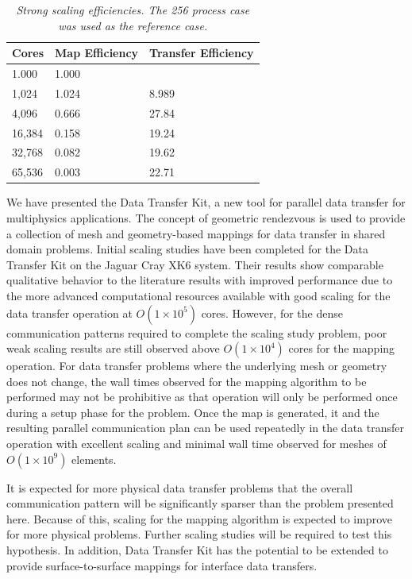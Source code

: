 \documentclass{mc2013}
\begin{document}
\begin{table}[htpb!]
  \begin{center}
    \begin{tabular}{lll}\hline\hline
      \multicolumn{1}{c}{Cores}& \multicolumn{1}{c}{Map Efficiency} &
      \multicolumn{1}{c}{Transfer Efficiency}\\\hline\hline %
      1.000 & 1.000 \\ 1,024 & 1.024 & 8.989 \\ 4,096 & 0.666 & 27.84
      \\ 16,384 & 0.158 & 19.24 \\ 32,768 & 0.082 & 19.62 \\ 65,536 &
      0.003 & 22.71 \\ \hline\hline
    \end{tabular}
  \end{center}
  \caption{\sl Strong scaling efficiencies. The 256 process case was
    used as the reference case.}
  \label{tab:strong_efficiency}
\end{table}


We have presented the Data Transfer Kit, a new tool for parallel data
transfer for multiphysics applications. The concept of geometric
rendezvous is used to provide a collection of mesh and geometry-based
mappings for data transfer in shared domain problems. Initial scaling
studies have been completed for the Data Transfer Kit on the Jaguar
Cray XK6 system. Their results show comparable qualitative behavior to
the literature results with improved performance due to the more
advanced computational resources available with good scaling for the
data transfer operation at $O(1 \times 10^5)$ cores. However, for the
dense communication patterns required to complete the scaling study
problem, poor weak scaling results are still observed above $O(1
\times 10^4)$ cores for the mapping operation. For data transfer
problems where the underlying mesh or geometry does not change, the
wall times observed for the mapping algorithm to be performed may not
be prohibitive as that operation will only be performed once during a
setup phase for the problem. Once the map is generated, it and the
resulting parallel communication plan can be used repeatedly in the
data transfer operation with excellent scaling and minimal wall time
observed for meshes of $O(1 \times 10^9)$ elements.

It is expected for more physical data transfer problems that the
overall communication pattern will be significantly sparser than the
problem presented here. Because of this, scaling for the mapping
algorithm is expected to improve for more physical problems. Further
scaling studies will be required to test this hypothesis. In addition,
Data Transfer Kit has the potential to be extended to provide
surface-to-surface mappings for interface data transfers.
\end{document}
